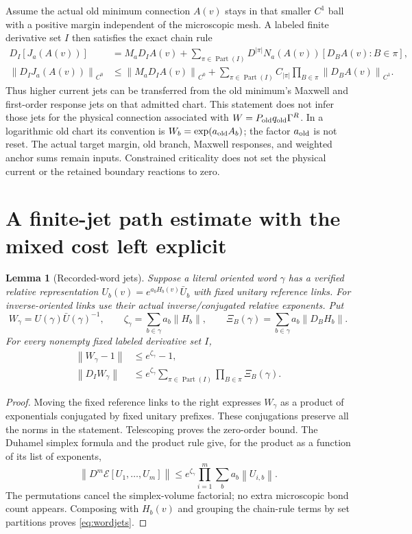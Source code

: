 \documentclass[11pt,letterpaper]{article}
\theoremstyle{plain}
\newtheorem{lemma}[theorem]{Lemma}
\theoremstyle{remark}\newtheorem{remark}[theorem]{Scope}
\DeclareMathOperator{\Part}{Part}\DeclareMathOperator{\diam}{diam}
\newcommand{\norm}[1]{\left\lVert#1\right\rVert}
\begin{document}
Assume the actual old minimum connection $A(v)$ stays in that smaller
$C^1$ ball with a positive margin independent of the microscopic mesh.
A labeled finite derivative set $I$ then satisfies the exact chain rule
\begin{align}
 D_I[J_a(A(v))]
 &=M_aD_IA(v)
   +\sum_{\pi\in\Part(I)}
     D^{|\pi|}N_a(A(v))[D_BA(v):B\in\pi],\\
 \norm{D_IJ_a(A(v))}_{C^0}
 &\le\norm{M_aD_IA(v)}_{C^0}
   +\sum_{\pi\in\Part(I)}C_{|\pi|}
                  \prod_{B\in\pi}\norm{D_BA(v)}_{C^1}.
 \label{eq:owncurrent}
\end{align}
Thus higher current jets can be transferred from the old minimum's
Maxwell and first-order response jets on that admitted chart. This statement
does not infer those jets for the physical connection associated with
$W=P_{\rm old}q_{\rm old}\Gamma^R$. In a logarithmic old chart its convention
is $W_b=\exp(a_{\rm old}A_b)$; the factor $a_{\rm old}$ is not reset.
The actual target margin, old branch, Maxwell responses, and weighted anchor
sums remain inputs. Constrained criticality does not set the physical
current or the retained boundary reactions to zero.

\section{A finite-jet path estimate with the mixed cost left explicit}

\begin{lemma}[Recorded-word jets]
Suppose a literal oriented word $\gamma$ has a verified relative representation
$U_b(v)=e^{a_bH_b(v)}\bar U_b$ with fixed unitary reference links.
For inverse-oriented links use their actual inverse/conjugated relative
exponents. Put
\[
 W_\gamma=U(\gamma)\bar U(\gamma)^{-1},\qquad
 \zeta_\gamma=\sum_{b\in\gamma}a_b\norm{H_b},\qquad
 \Xi_B(\gamma)=\sum_{b\in\gamma}a_b\norm{D_BH_b}.
\]
For every nonempty fixed labeled derivative set $I$,
\begin{align}
 \norm{W_\gamma-1}&\le e^{\zeta_\gamma}-1,\\
 \norm{D_IW_\gamma}
 &\le e^{\zeta_\gamma}
        \sum_{\pi\in\Part(I)}\prod_{B\in\pi}\Xi_B(\gamma).
 \label{eq:wordjets}
\end{align}
\end{lemma}

\begin{proof}
Moving the fixed reference links to the right expresses $W_\gamma$ as a
product of exponentials conjugated by fixed unitary prefixes. These
conjugations preserve all the norms in the statement. Telescoping proves
the zero-order bound. The Duhamel simplex formula and the product rule give,
for the product as a function of its list of exponents,
\[
 \norm{D^m\mathcal E[U_1,\ldots,U_m]}
 \le e^{\zeta_\gamma}
            \prod_{i=1}^m\sum_b a_b\norm{U_{i,b}}.
\]
The permutations cancel the simplex-volume factorial; no extra microscopic
bond count appears. Composing with $H_b(v)$ and grouping the chain-rule
terms by set partitions proves \eqref{eq:wordjets}.
\end{proof}
\end{document}
